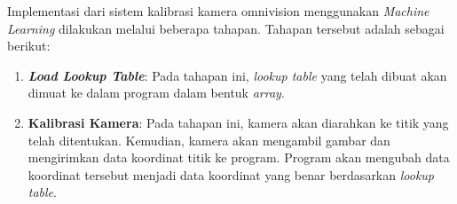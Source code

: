 Implementasi dari sistem kalibrasi kamera omnivision menggunakan \emph{Machine Learning} dilakukan melalui beberapa tahapan. Tahapan tersebut adalah sebagai berikut: 

\begin{enumerate}
  \item \textbf{\emph{Load Lookup Table}}: Pada tahapan ini, \emph{lookup table} yang telah dibuat akan dimuat ke dalam program dalam bentuk \emph{array}. 
  \item \textbf{Kalibrasi Kamera}: Pada tahapan ini, kamera akan diarahkan ke titik yang telah ditentukan. Kemudian, kamera akan mengambil gambar dan mengirimkan data koordinat titik ke program. Program akan mengubah data koordinat tersebut menjadi data koordinat yang benar berdasarkan \emph{lookup table}.
\end{enumerate}